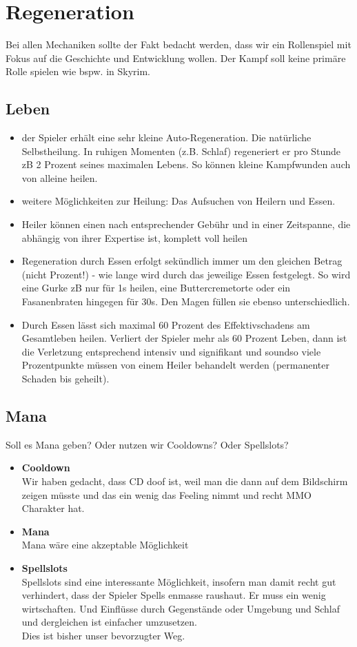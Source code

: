 \chapter{Regeneration}
Bei allen Mechaniken sollte der Fakt bedacht werden, dass wir ein Rollenspiel mit Fokus auf die Geschichte und Entwicklung wollen. Der Kampf soll keine primäre Rolle spielen wie bspw. in Skyrim.

\section{Leben}
\begin{itemize}
	\item der Spieler erhält eine sehr kleine Auto-Regeneration. Die natürliche Selbstheilung. In ruhigen Momenten (z.B. Schlaf) regeneriert er pro Stunde zB 2 Prozent seines maximalen Lebens. So können kleine Kampfwunden auch von alleine heilen.
	\item weitere Möglichkeiten zur Heilung: Das Aufsuchen von Heilern und Essen.
	\item Heiler können einen nach entsprechender Gebühr und in einer Zeitspanne, die abhängig von ihrer Expertise ist, komplett voll heilen
	\item Regeneration durch Essen erfolgt sekündlich immer um den gleichen Betrag (nicht Prozent!) - wie lange wird durch das jeweilige Essen festgelegt. So wird eine Gurke zB nur für 1s heilen, eine Buttercremetorte oder ein Fasanenbraten hingegen für 30s. Den Magen füllen sie ebenso unterschiedlich. 
	\item Durch Essen lässt sich maximal 60 Prozent des Effektivschadens am Gesamtleben heilen. Verliert der Spieler mehr als 60 Prozent Leben, dann ist die Verletzung entsprechend intensiv und signifikant und soundso viele Prozentpunkte müssen von einem Heiler behandelt werden (permanenter Schaden bis geheilt).
\end{itemize}

\section{Mana}
Soll es Mana geben? Oder nutzen wir Cooldowns? Oder Spellslots?\\
\begin{itemize}
	\item \textbf{Cooldown}\\
	Wir haben gedacht, dass CD doof ist, weil man die dann auf dem Bildschirm zeigen müsste und das ein wenig das Feeling nimmt und recht MMO Charakter hat.
	\item \textbf{Mana}\\
	Mana wäre eine akzeptable Möglichkeit
	\item \textbf{Spellslots}\\
	Spellslots sind eine interessante Möglichkeit, insofern man damit recht gut verhindert, dass der Spieler Spells enmasse raushaut. Er muss ein wenig wirtschaften. Und Einflüsse durch Gegenstände oder Umgebung und Schlaf und dergleichen ist einfacher umzusetzen.\\
	Dies ist bisher unser bevorzugter Weg.
\end{itemize}




